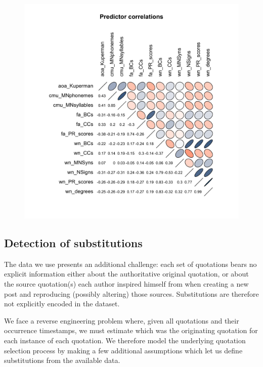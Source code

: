 \begin{figure}[!th]
    \includegraphics[width=\linewidth]{algorithms/Rplot.pdf}
\end{figure}

\subsection{Detection of substitutions}

The data we use presents an additional challenge: each set of quotations bears no explicit information either about the authoritative original quotation, or about the source quotation(s) each author inspired himself from when creating a new post and reproducing (possibly altering) those sources.
Substitutions are therefore not explicitly encoded in the dataset.

We face a reverse engineering problem where, given all quotations and their occurrence timestamps, we must estimate which was the originating quotation for each instance of each quotation.
We therefore model the underlying quotation selection process by making a few additional assumptions which let us define substitutions from the available data.

